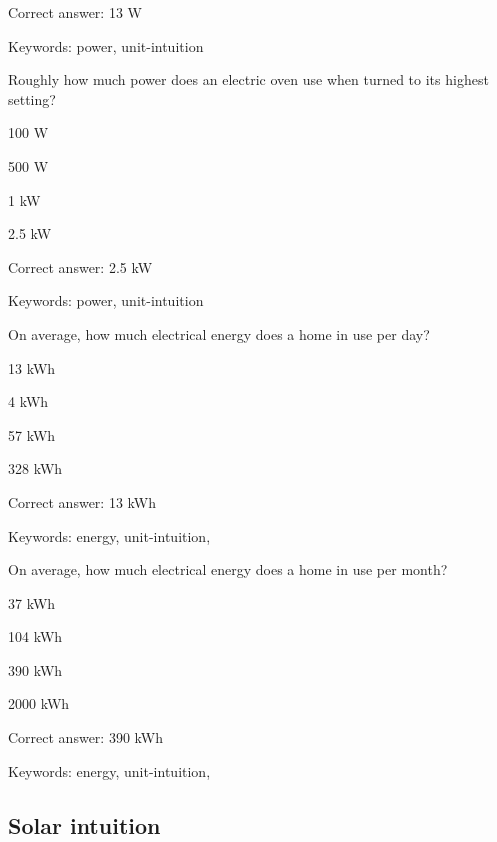 Correct answer: 13 W

Keywords: power, unit-intuition

\begin{question}
	\item Roughly how much power does an electric oven use when turned to its highest setting?
\end{question}

\begin{answer}
	\item 100 W
	\item 500 W
	\item 1 kW
	\item 2.5 kW
\end{answer}

Correct answer: 2.5 kW

Keywords: power, unit-intuition

\begin{question}
	\item On average, how much electrical energy does a home in \Hawaii use per day?
\end{question}

\begin{answer}
	\item 13 kWh
	\item 4 kWh
	\item 57 kWh
	\item 328 kWh
\end{answer}

Correct answer: 13 kWh

Keywords: energy, unit-intuition, \Hawaii 

\begin{question}
	\item On average, how much electrical energy does a home in \Hawaii use per month?
\end{question}

\begin{answer}
	\item 37 kWh
	\item 104 kWh
	\item 390 kWh
	\item 2000 kWh
\end{answer}

Correct answer: 390 kWh

Keywords: energy, unit-intuition, \Hawaii 

\subsection{Solar intuition}

